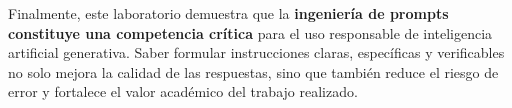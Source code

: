 \documentclass[11pt,a4paper]{article}
\begin{document}
Finalmente, este laboratorio demuestra que la \textbf{ingeniería de prompts constituye una competencia crítica} para el uso responsable de inteligencia artificial generativa. Saber formular instrucciones claras, específicas y verificables no solo mejora la calidad de las respuestas, sino que también reduce el riesgo de error y fortalece el valor académico del trabajo realizado.
\end{document}
